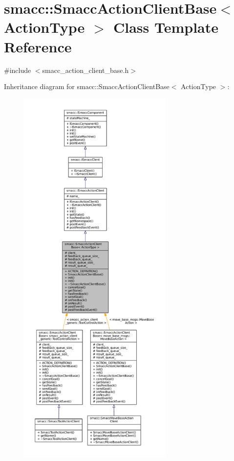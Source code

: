 \hypertarget{classsmacc_1_1SmaccActionClientBase}{}\section{smacc\+:\+:Smacc\+Action\+Client\+Base$<$ Action\+Type $>$ Class Template Reference}
\label{classsmacc_1_1SmaccActionClientBase}


{\ttfamily \#include $<$smacc\+\_\+action\+\_\+client\+\_\+base.\+h$>$}



Inheritance diagram for smacc\+:\+:Smacc\+Action\+Client\+Base$<$ Action\+Type $>$\+:
\nopagebreak
\begin{figure}[H]
\begin{center}
\leavevmode
\includegraphics[height=550pt]{classsmacc_1_1SmaccActionClientBase__inherit__graph}
\end{center}
\end{figure}


